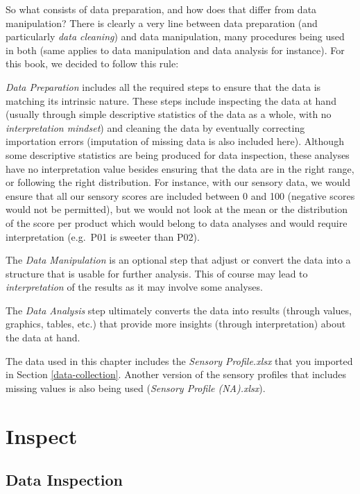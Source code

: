 \documentclass[
]{book}
\begin{document}
So what consists of data preparation, and how does that differ from data manipulation?
There is clearly a very line between data preparation (and particularly \emph{data cleaning}) and data manipulation, many procedures being used in both (same applies to data manipulation and data analysis for instance). For this book, we decided to follow this rule:

\emph{Data Preparation} includes all the required steps to ensure that the data is matching its intrinsic nature. These steps include inspecting the data at hand (usually through simple descriptive statistics of the data as a whole, with no \emph{interpretation mindset}) and cleaning the data by eventually correcting importation errors (imputation of missing data is also included here). Although some descriptive statistics are being produced for data inspection, these analyses have no interpretation value besides ensuring that the data are in the right range, or following the right distribution. For instance, with our sensory data, we would ensure that all our sensory scores are included between 0 and 100 (negative scores would not be permitted), but we would not look at the mean or the distribution of the score per product which would belong to data analyses and would require interpretation (e.g.~P01 is sweeter than P02).

The \emph{Data Manipulation} is an optional step that adjust or convert the data into a structure that is usable for further analysis. This of course may lead to \emph{interpretation} of the results as it may involve some analyses.

The \emph{Data Analysis} step ultimately converts the data into results (through values, graphics, tables, etc.) that provide more insights (through interpretation) about the data at hand.

The data used in this chapter includes the \emph{Sensory Profile.xlsx} that you imported in Section \ref{data-collection}. Another version of the sensory profiles that includes missing values is also being used (\emph{Sensory Profile (NA).xlsx}).

\hypertarget{inspect}{%
\section{Inspect}\label{inspect}}

\hypertarget{data-inspection}{%
\subsection{Data Inspection}\label{data-inspection}}
\end{document}
